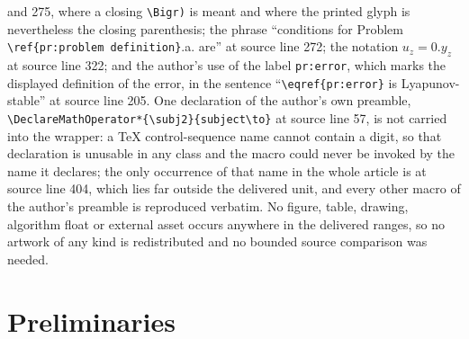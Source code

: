 \documentclass[10pt,a4paper]{amsart}
\theoremstyle{remark}
\begin{document}
and 275, where a closing \texttt{\textbackslash Bigr)} is meant and where the printed glyph is nevertheless the closing parenthesis; the phrase ``conditions for Problem \texttt{\textbackslash ref\{pr:problem definition\}}.a. are'' at source line 272; the notation $u_z=0.y_z$ at source line 322; and the author's use of the label \texttt{pr:error}, which marks the displayed definition of the error, in the sentence ``\texttt{\textbackslash eqref\{pr:error\}} is Lyapunov-stable'' at source line 205. One declaration of the author's own preamble, \texttt{\textbackslash DeclareMathOperator*\{\textbackslash subj2\}\{subject\textbackslash to\}} at source line 57, is not carried into the wrapper: a TeX control-sequence name cannot contain a digit, so that declaration is unusable in any class and the macro could never be invoked by the name it declares; the only occurrence of that name in the whole article is at source line 404, which lies far outside the delivered unit, and every other macro of the author's preamble is reproduced verbatim. No figure, table, drawing, algorithm float or external asset occurs anywhere in the delivered ranges, so no artwork of any kind is redistributed and no bounded source comparison was needed.
\section{Preliminaries} \label{sec:Prel}
\end{document}
